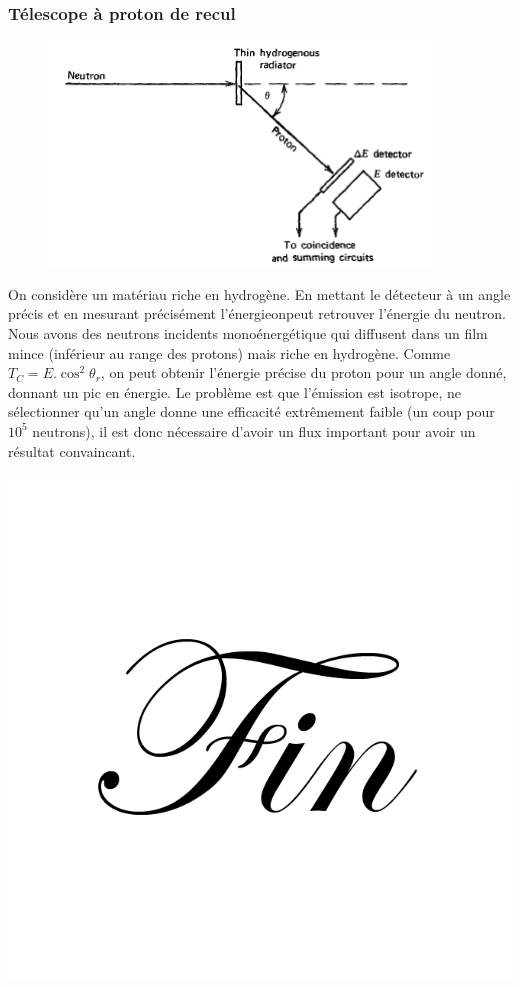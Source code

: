 \subsubsection{Télescope à proton de recul}
	\begin{figure}
	\vspace{-4mm}
	\includegraphics[scale=0.75]{ch11/image13}
	\end{figure}
On considère un matériau riche en hydrogène. En mettant le détecteur à un angle précis et en mesurant
précisément l'énergieonpeut retrouver l'énergie du neutron. Nous avons des neutrons incidents
monoénergétique qui diffusent dans un film mince (inférieur au range des protons) mais riche en 
hydrogène. Comme $T_C=E.\cos^2\theta_r$, on peut obtenir l'énergie précise du proton pour un angle
donné, donnant un pic en énergie. Le problème est que l'émission est isotrope, ne sélectionner qu'un
angle donne une efficacité extrêmement faible (un coup pour $10^5$ neutrons), il est donc nécessaire
d'avoir un flux important pour avoir un résultat convaincant.




\vspace{4cm}
\begin{center}
\includegraphics[scale=0.2]{ch11/fin}
\end{center}